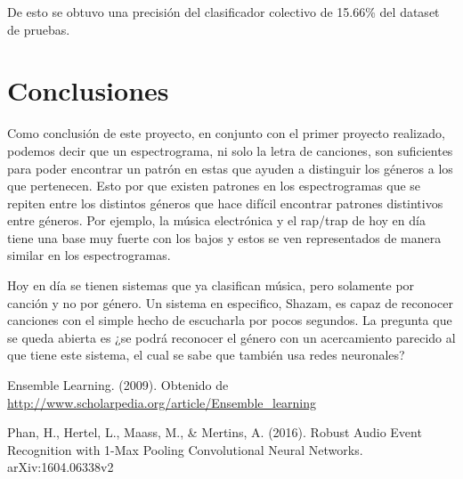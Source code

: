\documentclass[spanish,11pt,letterpaper]{article}
\begin{document}
De esto se obtuvo una precisión del clasificador colectivo de 15.66\% del dataset de pruebas.

\section{Conclusiones}

Como conclusión de este proyecto, en conjunto con el primer proyecto realizado, podemos decir que un espectrograma, ni solo la letra de canciones, son suficientes para poder encontrar un patrón en estas que ayuden a distinguir los géneros a los que pertenecen. Esto por que existen patrones en los espectrogramas que se repiten entre los distintos géneros que hace difícil encontrar patrones distintivos entre géneros. Por ejemplo, la música electrónica y el rap/trap de hoy en día tiene una base muy fuerte con los bajos y estos se ven representados de manera similar en los espectrogramas.

Hoy en día se tienen sistemas que ya clasifican música, pero solamente por canción y no por género. Un sistema en especifico, Shazam, es capaz de reconocer canciones con el simple hecho de escucharla por pocos segundos. La pregunta que se queda abierta es ¿se podrá reconocer el género con un acercamiento parecido al que tiene este sistema, el cual se sabe que también usa redes neuronales?

\begin{thebibliography}{9}
Ensemble Learning. (2009). Obtenido de
\url{http://www.scholarpedia.org/article/Ensemble_learning}

Phan, H., Hertel, L., Maass, M., \& Mertins, A. (2016).
Robust Audio Event Recognition with 1-Max Pooling Convolutional Neural Networks.
arXiv:1604.06338v2

\end{thebibliography}
\end{document}
